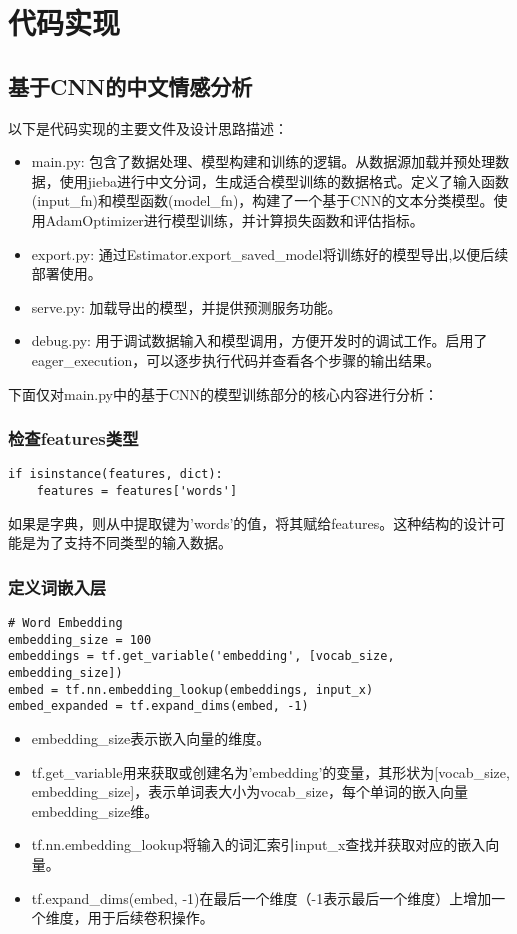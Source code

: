\section{代码实现}

\subsection{基于CNN的中文情感分析}
以下是代码实现的主要文件及设计思路描述：

\begin{itemize}
    \item main.py: 包含了数据处理、模型构建和训练的逻辑。从数据源加载并预处理数据，使用jieba进行中文分词，生成适合模型训练的数据格式。定义了输入函数(input\_fn)和模型函数(model\_fn)，构建了一个基于CNN的文本分类模型。使用AdamOptimizer进行模型训练，并计算损失函数和评估指标。
    \item export.py: 通过Estimator.export\_saved\_model将训练好的模型导出,以便后续部署使用。
    \item serve.py: 加载导出的模型，并提供预测服务功能。
    \item debug.py: 用于调试数据输入和模型调用，方便开发时的调试工作。启用了eager\_execution，可以逐步执行代码并查看各个步骤的输出结果。
\end{itemize}

下面仅对main.py中的基于CNN的模型训练部分的核心内容进行分析：

\subsubsection{检查features类型}

    \begin{lstlisting}
if isinstance(features, dict): 
    features = features['words']\end{lstlisting}

如果是字典，则从中提取键为'words'的值，将其赋给features。这种结构的设计可能是为了支持不同类型的输入数据。

\subsubsection{定义词嵌入层}

    \begin{lstlisting}
# Word Embedding
embedding_size = 100
embeddings = tf.get_variable('embedding', [vocab_size, embedding_size])
embed = tf.nn.embedding_lookup(embeddings, input_x)
embed_expanded = tf.expand_dims(embed, -1)\end{lstlisting}
\begin{itemize}
    \item embedding\_size表示嵌入向量的维度。
    \item tf.get\_variable用来获取或创建名为'embedding'的变量，其形状为[vocab\_size, embedding\_size]，表示单词表大小为vocab\_size，每个单词的嵌入向量embedding\_size维。
    \item tf.nn.embedding\_lookup将输入的词汇索引input\_x查找并获取对应的嵌入向量。
    \item tf.expand\_dims(embed, -1)在最后一个维度（-1表示最后一个维度）上增加一个维度，用于后续卷积操作。
\end{itemize}

